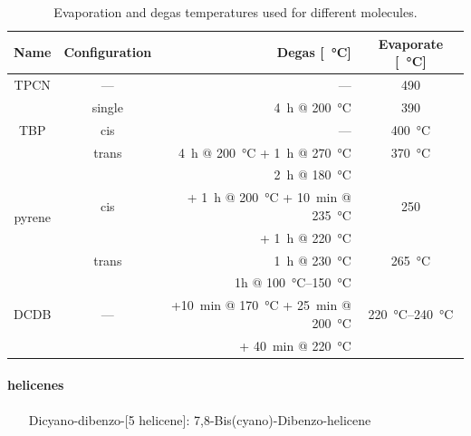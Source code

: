 \begin{table}
	\centering
	\caption{Evaporation and degas temperatures used for different molecules.}
	\begin{tabular}{ccrc}
		Name			& Configuration & Degas [\SI{}{\degreeCelsius}]	& Evaporate [\SI{}{\degreeCelsius}]	\\ \hline \hline 
		TPCN			& ---		& ---		& 490		\\ \hline 
		\multirow{3}{*}{TBP}	&single		& \SI{4}{\hour} @ \SI{200}{\degreeCelsius}& 390	\\
		&cis		& ---		& \SI{400}{\degreeCelsius}\\
		&trans		& \SI{4}{\hour} @ \SI{200}{\degreeCelsius} + \SI{1}{\hour} @ \SI{270}{\degreeCelsius}&\SI{370}{\degreeCelsius}\\ \hline 
		\multirow{4}{*}{pyrene} & \multirow{3}{*}{cis}		& \SI{2}{\hour} @ \SI{180}{\degreeCelsius}&	\multirow{3}{*}{250}	\\
		&&+ \SI{1}{\hour} @ \SI{200}{\degreeCelsius} + \SI{10}{\minute} @ \SI{235}{\degreeCelsius} 	&\\
		&&+ \SI{1}{\hour} @ \SI{220}{\degreeCelsius}&\\ 
		&trans		& \SI{1}{\hour} @ \SI{230}{\degreeCelsius}		&\SI{265}{\degreeCelsius}		\\ \hline
		\multirow{3}{*}{DCDB} & \multirow{3}{*}{---} & 1h @ \SIrange{100}{150}{\degreeCelsius}& \multirow{3}{*}{\SIrange{220}{240}{\degreeCelsius}}\\
		&&+\SI{10}{\minute} @ \SI{170}{\degreeCelsius} + \SI{25}{\minute} @ \SI{200}{\degreeCelsius} & \\
		&&+ \SI{40}{\minute} @ \SI{220}{\degreeCelsius}&\\
	\end{tabular}
	\label{tab:molecule-temperatures}
\end{table}


\paragraph{helicenes}
\begin{itemize}
	\item[Dicyano-dibenzo-[5]helicene]: 7,8-Bis(cyano)-Dibenzo-helicene
\end{itemize}


